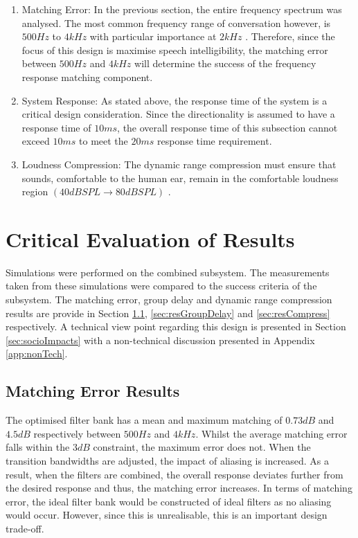 \documentclass[11pt,onecolumn]{witseiepaper}
\begin{document}
\begin{enumerate}
	\item Matching Error: In the previous section, the entire frequency spectrum was analysed. The most common frequency range of conversation however, is $500Hz$ to $4kHz$ with particular importance at $2kHz$ \cite{speechDPA}. Therefore, since the focus of this design is maximise speech intelligibility, the matching error between $500Hz$ and $4kHz$ will determine the success of the frequency response matching component.
	\item System Response: As stated above, the response time of the system is a critical design consideration. Since the directionality is assumed to have a response time of $10ms$, the overall response time of this subsection cannot exceed $10ms$ to meet the $20ms$ response time requirement.
	\item Loudness Compression: The dynamic range compression must ensure that sounds, comfortable to the human ear, remain in the comfortable loudness region $(40dBSPL \rightarrow 80dBSPL)$ \cite{loudRange}.
\end{enumerate}


\section{Critical Evaluation of Results}

\noindent Simulations were performed on the combined subsystem. The measurements taken from these simulations were compared to the success criteria of the subsystem. The matching error, group delay and dynamic range compression results are provide in Section \ref{sec:resMatErr}, \ref{sec:resGroupDelay} and \ref{sec:resCompress} respectively. A technical view point regarding this design is presented in Section \ref{sec:socioImpacts} with a non-technical discussion presented in Appendix \ref{app:nonTech}.
 
	\subsection{Matching Error Results}
\label{sec:resMatErr}

\noindent The optimised filter bank has a mean and maximum matching of $0.73dB$ and $4.5dB$ respectively between $500Hz$ and $4kHz$. Whilst the average matching error falls within the $3dB$ constraint, the maximum error does not. When the transition bandwidths are adjusted, the impact of aliasing is increased. As a result, when the filters are combined, the overall response deviates further from the desired response and thus, the matching error increases. In terms of matching error, the ideal filter bank would be constructed of ideal filters as no aliasing would occur. However, since this is unrealisable, this is an important design trade-off. 
\end{document}
